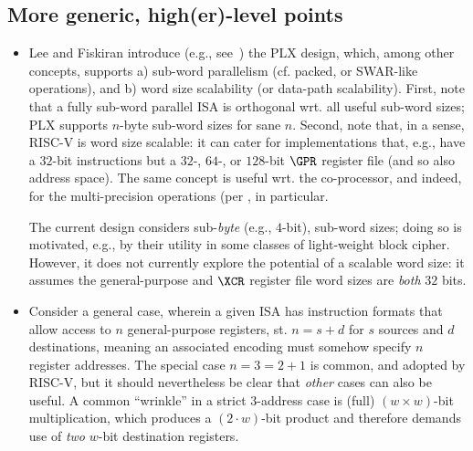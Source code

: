 
\subsection{More  generic, high(er)-level points}
\label{appx:discuss:hi}

\begin{itemize}

\item Lee and Fiskiran introduce (e.g., see~\cite{SCARV:LeeFis:05}) the PLX
      design, which, among other concepts, supports 
      a) sub-word parallelism (cf. packed, or SWAR-like operations),
         and
      b) word size scalability (or data-path scalability).
      First, 
      note that a fully sub-word parallel ISA is orthogonal wrt. all useful
      sub-word sizes; PLX supports $n$-byte sub-word sizes for sane $n$.
      Second,
      note that, in a sense, RISC-V is word size scalable: it can cater for
      implementations that, e.g., have a $32$-bit instructions but a $32$-,
      $64$-, or $128$-bit $\GPR$ register file (and so also address space). 
      The same concept is useful wrt. the co-processor, and indeed, for the
      multi-precision operations
      (per ,
      in particular.

      The current design considers sub-{\em byte} (e.g., $4$-bit), sub-word
      sizes; doing so is motivated, e.g., by their utility in some classes 
      of light-weight block cipher.  However, it does not currently explore 
      the potential of a scalable word size: it assumes the general-purpose
      and $\XCR$ register file word sizes are {\em both} $32$ bits.

\item Consider a general case, wherein a given ISA has instruction formats
      that allow access to $n$ general-purpose registers, st. 
      $
      n = s + d
      $ 
      for $s$ sources and $d$ destinations, meaning an associated encoding 
      must somehow specify $n$ register addresses.  The special case
      $
      n = 3 = 2 + 1 
      $
      is common, and adopted by RISC-V, but it should nevertheless be clear
      that {\em other} cases can also be useful.  A common ``wrinkle'' in a 
      strict $3$-address case is (full) $( w \times w )$-bit multiplication, 
      which produces a $(2 \cdot w )$-bit product and therefore demands use 
      of {\em two} $w$-bit destination registers.
   

\end{itemize}
